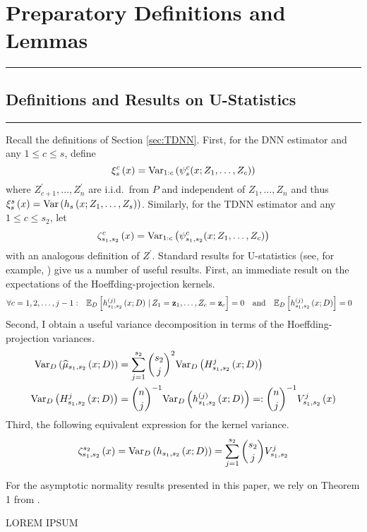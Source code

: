 \section{Preparatory Definitions and Lemmas}
\hrule

\subsection{Definitions and Results on U-Statistics}
\hrule

Recall the definitions of Section \ref{sec:TDNN}.
First, for the DNN estimator and any $1 \leq c \leq s$, define
\begin{equation}\label{eq:xi_s_c}
	\xi_{s}^{c}\left(x\right)
	= \text{Var}_{1:c}\left(\psi_{s}^{c}(x; Z_{1}, \dotsc, Z_{c})\right)
\end{equation}
where $Z_{c+1}^{\prime}, \ldots, Z_n^{\prime}$ are i.i.d.\ from $P$ and independent of $Z_1, \ldots, Z_n$ and thus
$\xi_{s}^{s}\left(x\right) = \text{Var}\left(h_s\left(x; Z_1, \ldots, Z_s\right)\right)$.
Similarly, for the TDNN estimator and any $1 \leq c \leq s_2$, let
\begin{equation}\label{eq:zeta_s1s2_c}
	\zeta_{s_1, s_2}^{c}\left(x\right)
	= \text{Var}_{1:c}\left(\psi_{s_1, s_2}^{c}(x; Z_{1}, \dotsc, Z_{c})\right)
\end{equation}
with an analogous definition of $Z^{\prime}$.
Standard results for U-statistics (see, for example, \citet{lee_u-statistics_2019}) give us a number of useful results.
First, an immediate result on the expectations of the Hoeffding-projection kernels.
\begin{align}\label{eq:H_k_expectation}
	\forall c = 1,2,\dotsc, j-1: \quad & \mathbb{E}_{D}\left[h_{s_1, s_2}^{(j)}\left(x; D\right) \, | \, Z_1 = \mathbf{z}_1, \dotsc, Z_c = \mathbf{z}_c\right] = 0
	\quad \text{and} \quad
	\mathbb{E}_{D}\left[h_{s_1, s_2}^{(j)}\left(x; D\right)\right] = 0
\end{align}
Second, I obtain a useful variance decomposition in terms of the Hoeffding-projection variances.
\begin{align}\label{eq:Var_decomp}
	\text{Var}_{D}\left(\widehat{\mu}_{s_1, s_2}\left(x; D\right)\right)
	 & = \sum_{j = 1}^{s_2} \binom{s_2}{j}^2 \text{Var}_{D}\left(H_{s_1, s_2}^{j}\left(x; D\right)\right) \\
	\text{Var}_{D}\left(H_{s_1, s_2}^{j}\left(x; D\right)\right)
	 & = \binom{n}{j}^{-1} \text{Var}_{D}\left(h_{s_1, s_2}^{(j)}\left(x; D\right)\right)
	=: \binom{n}{j}^{-1} V_{s_1, s_2}^{j}\left(x\right)
\end{align}
Third, the following equivalent expression for the kernel variance.
\begin{equation}\label{eq:k_var}
	\zeta_{s_1, s_2}^{s_2}\left(x\right)
	= \text{Var}_{D}\left(h_{s_1, s_2}\left(x; D\right)\right)
	= \sum_{j = 1}^{s_2} \binom{s_2}{j}V_{s_1, s_2}^{j}
\end{equation}

For the asymptotic normality results presented in this paper, we rely on Theorem 1 from \citet{peng_rates_2022}.
\begin{boxD}
    \begin{thm}
        {\color{red} LOREM IPSUM}
    \end{thm}    
\end{boxD}
